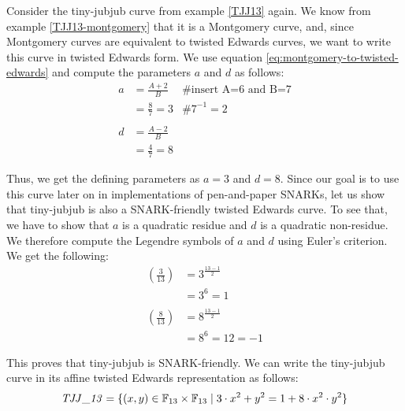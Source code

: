 \begin{example}Consider the tiny-jubjub curve from example \ref{TJJ13} again. We know from example \ref{TJJ13-montgomery} that it is a Montgomery curve, and, since Montgomery curves are equivalent to twisted Edwards curves, we want to write this curve in twisted Edwards form. We use equation \ref{eq:montgomery-to-twisted-edwards} and compute the parameters $a$ and $d$ as follows:
\begin{align*}
a & = \frac{A+2}{B} & \text{\# insert A=6 and B=7}\\
  & = \frac{8}{7} = 3 & \text{\# } 7^{-1}= 2 \\
  \\
d & = \frac{A-2}{B} \\
  & = \frac{4}{7} = 8 
\end{align*}

Thus, we get the defining parameters as $a= 3$ and $d=8$. Since our goal is to use this curve later on in implementations of pen-and-paper SNARKs, let us show that tiny-jubjub is also a SNARK-friendly twisted Edwards curve. To see that, we  have to show that $a$ is a quadratic residue and $d$ is a quadratic non-residue. We therefore compute the Legendre symbols of $a$ and $d$ using Euler's criterion. We get the following:
\begin{align*}
\left(\frac{3}{13}\right) &= 3^{\frac{13-1}{2}} \\
                          & = 3^6 
                            = 1\\
                          \\
\left(\frac{8}{13}\right) &= 8^{\frac{13-1}{2}} \\
                          & = 8^6 
                            = 12
                            = -1                     
\end{align*}

This proves that tiny-jubjub is SNARK-friendly. We can write the tiny-jubjub curve in its affine twisted Edwards representation as follows:
\begin{equation}\label{TJJ13-twisted-edwards}
\mathit{TJJ\_13} = \{(x,y)\in \mathbb{F}_{13}\times \mathbb{F}_{13}\;|\; 3\cdot x^{2} + y^2 =1+ 8\cdot x^{2}\cdot y^2 \}
\end{equation}


\end{example}
